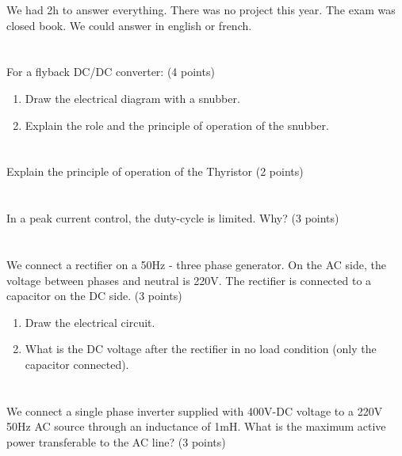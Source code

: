 \documentclass[en]{sourcefiles/eplexam} %
\begin{document}
\noindent We had 2h to answer everything. There was no project this year. The exam was closed book. We could answer in english or french.

\section{}
For a flyback DC/DC converter: (4 points)
\begin{enumerate}

    \item Draw the electrical diagram with a snubber.

    \item Explain the role and the principle of operation of the snubber.
\end{enumerate}
\nosolution


\section{}
Explain the principle of operation of the Thyristor (2 points)

\nosolution


\section{}
In a peak current control, the duty-cycle is limited. Why? (3 points)
\nosolution


\section{}
We connect a rectifier on a 50Hz - three phase generator. On the AC side, the voltage between phases and neutral is 220V. The rectifier is connected to a capacitor on the DC side. (3 points)

\begin{enumerate}
    \item Draw the electrical circuit.
    \item What is the DC voltage after the rectifier in no load condition (only the capacitor connected).
\end{enumerate}

\nosolution



\section{}
We connect a single phase inverter supplied with 400V-DC voltage to a 220V 50Hz AC source through an inductance of 1mH.
What is the maximum active power transferable to the AC line? (3 points)
\end{document}
